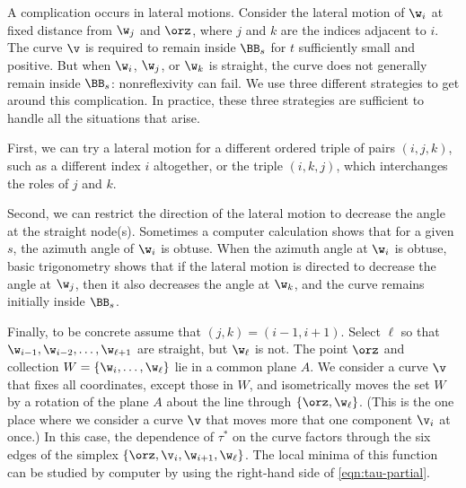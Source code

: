 \begin{remark}
  A complication occurs in lateral motions.  Consider the lateral
  motion of $\w_i$ at fixed distance from $\w_j$ and $\orz$, where $j$
  and $k$ are the indices adjacent to $i$.  The curve $\v$ is required
  to remain inside $\BB_s$ for $t$ sufficiently small and positive.
  But when $\w_i$, $\w_j$, or $\w_k$ is straight, the curve does not
  generally remain inside $\BB_s$: nonreflexivity can fail.  We use
  three different strategies to get around this complication.  In
  practice, these three strategies are sufficient to handle all the
  situations that arise.

  First, we can try a lateral motion for a different ordered triple of
  pairs $(i,j,k)$, such as a different index $i$ altogether, or the
  triple $(i,k,j)$, which interchanges the roles of $j$ and $k$.
 
  Second, we can restrict the direction of the lateral motion to
  decrease the angle at the straight node(s).  Sometimes a computer
  calculation shows that for a given $s$, the azimuth angle of $\w_i$
  is obtuse.  When the azimuth angle at $\w_i$ is obtuse, basic
  trigonometry shows that if the lateral motion is directed to
  decrease the angle at $\w_j$, then it also decreases the angle at
  $\w_k$, and the curve remains initially inside $\BB_s$.

  Finally, to be concrete assume that $(j,k)=(i-1,i+1)$.  Select $\ell$
  so that $\w_{i-1},\w_{i-2},\ldots,\w_{\ell+1}$ are straight, but
  $\w_{\ell}$ is not. The point $\orz$ and collection
  $W=\{\w_{i},\ldots,\w_{\ell}\}$ lie in a common plane $A$.  We
  consider a curve $\v$ that fixes all coordinates, except those in
  $W$, and isometrically moves the set $W$ by a rotation of the plane
  $A$ about the line through $\{\orz,\w_{\ell}\}$.  (This is the one
  place where we consider a curve $\v$ that moves more that one
  component $\v_i$ at once.)  In this case, the dependence of $\tau^*$
  on the curve factors through the six edges of the simplex
  $\{\orz,\v_i,\w_{i+1},\w_{\ell}\}$.  The local minima of this
  function can be studied by computer by using the right-hand side of
  \eqref{eqn:tau-partial}.
\end{remark}

